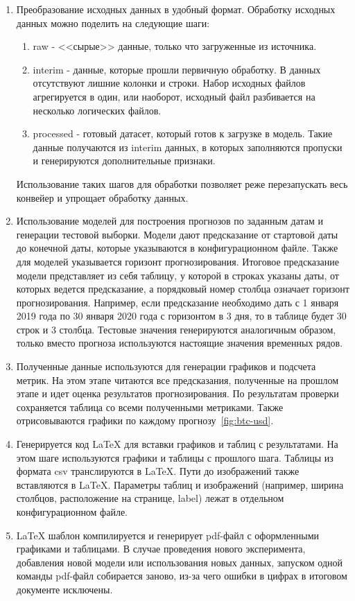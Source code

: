 \documentclass[a4paper,article,14pt]{extarticle}
\begin{document}
\begin{enumerate}
     данные через API Yahoo finance по интересующим тикерам (котировкам) за указанный временной интервал. Для работы с API Yahoo finance используется python-библиотека yfinance.

    \item Преобразование исходных данных в удобный формат.
Обработку исходных данных можно поделить на следующие шаги:

    \begin{enumerate}
        \item raw - <<сырые>> данные, только что загруженные из источника.
        \item interim - данные, которые прошли первичную обработку.
    В данных отсутствуют лишние колонки и строки.
    Набор исходных файлов агрегируется в один, или наоборот, исходный файл разбивается на несколько логических файлов.
        \item processed - готовый датасет, который готов к загрузке в модель.
    Такие данные получаются из interim данных, в которых заполняются пропуски и генерируются дополнительные признаки.
    \end{enumerate}
    Использование таких шагов для обработки позволяет реже перезапускать весь конвейер и упрощает обработку данных.
    \item Использование моделей для построения прогнозов по заданным датам и генерации тестовой выборки.
Модели дают предсказание от стартовой даты до конечной даты, которые указываются в конфигурационном файле.
Также для моделей указывается горизонт прогнозирования.
Итоговое предсказание модели представляет из себя таблицу, у которой в строках указаны даты, от которых ведется предсказание, а порядковый номер столбца означает горизонт прогнозирования.
Например, если предсказание необходимо дать с 1 января 2019 года по 30 января 2020 года с горизонтом в 3 дня, то в таблице будет 30 строк и 3 столбца.
Тестовые значения генерируются аналогичным образом, только вместо прогноза используются настоящие значения временных рядов.
    \item Полученные данные используются для генерации графиков и подсчета метрик.
На этом этапе читаются все предсказания, полученные на прошлом этапе и идет оценка результатов прогнозирования.
По результатам проверки сохраняется таблица со всеми полученными метриками.
Также отрисовываются графики по каждому прогнозу~\ref{fig:btc-usd}.
    \item Генерируется код LaTeX для вставки графиков и таблиц с результатами.
На этом шаге используются графики и таблицы с прошлого шага.
Таблицы из формата csv транслируются в LaTeX\@.
Пути до изображений также вставляются в LaTeX\@.
Параметры таблиц и изображений (например, ширина столбцов, расположение на странице, label) лежат в отдельном конфигурационном файле.
    \item LaTeX шаблон компилируется и генерирует pdf-файл с оформленными графиками и таблицами.
В случае проведения нового эксперимента, добавления новой модели или использования новых данных, запуском одной команды pdf-файл собирается заново, из-за чего ошибки в цифрах в итоговом документе исключены.
\end{enumerate}
\end{document}
